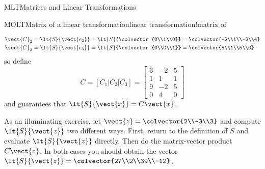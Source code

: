 \begin{subsect}{MLT}{Matrices and Linear Transformations}
\begin{example}{MOLT}{Matrix of a linear transformation}{linear transformation!matrix of}
\begin{para}
\begin{align*}
\vect{C}_2&=\lt{S}{\vect{e_2}}=\lt{S}{\colvector{0\\1\\0}}=\colvector{-2\\1\\-2\\4}\\
\vect{C}_3&=\lt{S}{\vect{e_3}}=\lt{S}{\colvector{0\\0\\1}}=\colvector{5\\1\\5\\0}
\end{align*}
%
so define
%
\begin{equation*}
C=\left[C_1|C_2|C_3\right]=
\begin{bmatrix}
3&-2&5\\
1&1&1\\
9&-2&5\\
0&4&0
\end{bmatrix}
\end{equation*}
%
and  guarantees that $\lt{S}{\vect{x}}=C\vect{x}$.\end{para}
%
\begin{para}As an illuminating exercise, let $\vect{z}=\colvector{2\\-3\\3}$ and compute $\lt{S}{\vect{z}}$ two different ways.  First, return to the definition of $S$ and evaluate $\lt{S}{\vect{z}}$ directly.  Then do the matrix-vector product $C\vect{z}$.  In both cases you should obtain the vector $\lt{S}{\vect{z}}=\colvector{27\\2\\39\\-12}$.\end{para}
%
\end{example}
%
%
\end{subsect}
%
